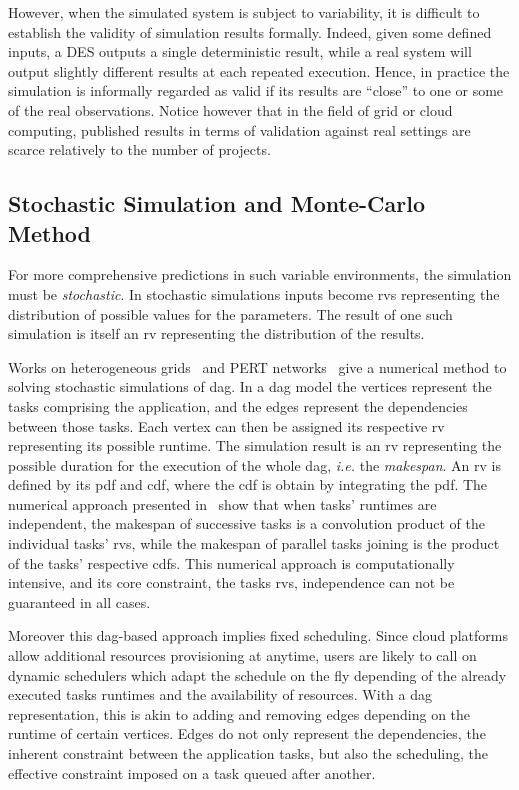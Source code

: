 \documentclass[]{llncs}
\begin{document}
However, when the simulated system is subject to variability, it is difficult to
establish  the  validity of  simulation  results  formally. Indeed,  given  some
defined inputs, a DES outputs a single deterministic result, while a real system
will output  slightly different results  at each repeated execution.   Hence, in
practice  the simulation  is informally  regarded as  valid if  its results  are
``close'' to one or  some of the real observations.  Notice  however that in the
field  of grid  or cloud  computing, published  results in  terms of  validation
against real settings are scarce relatively to the number of projects.


\subsection{Stochastic Simulation and Monte-Carlo Method}

\label{sc:relwork-stochastic}
For  more   comprehensive  predictions  in  such   variable  environments,  the
simulation must  be \emph{stochastic}.  In stochastic simulations  inputs become
\acfp{rv} representing the  distribution of possible values  for the parameters.
The  result  of one  such  simulation  is  itself  an \ac{rv}  representing  the
distribution  of the  results. 

Works on heterogeneous grids~\cite{Li97} and PERT networks~\cite{Ludwig01} give
a numerical method to solving stochastic simulations of \ac{dag}. In a \ac{dag} model 
the vertices represent the tasks  comprising the application, and the edges represent
the dependencies between those tasks.  Each vertex can then be assigned its respective
\ac{rv}  representing   its  possible  runtime. The simulation result is an \ac{rv}
representing  the possible  duration for  the execution  of the  whole \ac{dag},
\textit{i.e.} the \emph{makespan}. An \ac{rv} is  defined by its \ac{pdf}  and \ac{cdf},
where  the   \ac{cdf}  is  obtain   by  integrating  the  \ac{pdf}.
The numerical approach presented in~\cite{Li97, Ludwig01} show  that
when  tasks' runtimes  are  independent, the  makespan of  successive tasks is a
convolution product  of the individual  tasks' \acp{rv}, while the  makespan of
parallel tasks joining is the  product of  the tasks' respective \acp{cdf}. This
numerical approach is computationally intensive, and its core constraint,
the tasks \acp{rv}, independence can not be guaranteed in all cases.

Moreover this \ac{dag}-based approach implies fixed scheduling. 
Since cloud platforms allow additional resources provisioning at anytime,
users are likely to call on dynamic schedulers which adapt the schedule on the fly
depending of the already executed tasks runtimes and the availability of
resources. With a \ac{dag} representation, this is akin to adding
and removing edges depending on the runtime of certain vertices. Edges do not
only represent the dependencies, the inherent constraint between the application
tasks, but also the scheduling, the effective constraint imposed on a task queued
after another.
\end{document}
